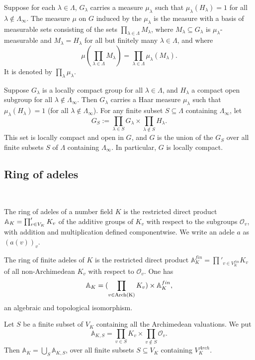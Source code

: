 \documentclass[12pt]{amsart}
\def\A{\mathbb{A}}
\numberwithin{equation}{section}
\begin{document}
Suppose for each $\lambda\in \Lambda$, $G_{\lambda}$ carries a measure $\mu_{\lambda}$ such that $\mu_{\lambda}(H_{\lambda})=1$ for all $\lambda\notin \Lambda_{\infty}$. 
The measure $\mu$ on 
$G$ induced by the $\mu_{\lambda}$ is the measure with a basis of measurable sets consisting of the sets 
$\prod_{\lambda\in \Lambda} M_{\lambda}$, where $M_{\lambda}\subseteq G_{\lambda}$ is $\mu_{\lambda}$-measurable and 
$M_{\lambda}=H_{\lambda}$ for all but finitely many $\lambda\in \Lambda$, and where $$\mu(\prod_{\lambda\in \Lambda} M_{\lambda})=\prod_{\lambda\in \Lambda} 
\mu_{\lambda}(M_{\lambda}).$$
It is denoted by $\prod_{\lambda} \mu_{\lambda}$.

Suppose $G_{\lambda}$ is a locally compact group for all $\lambda \in \Lambda$, and $H_{\lambda}$ a compact open subgroup 
for all $\lambda \notin \Lambda_{\infty}$. Then $G_{\lambda}$ carries a Haar measure $\mu_{\lambda}$ such that 
$\mu_{\lambda}(H_{\lambda})=1$ (for all $\lambda\notin \Lambda_{\infty}$). For any finite subset $S\subseteq \Lambda$ containing $\Lambda_{\infty}$, let 
$$G_S:=\prod_{\lambda\in S} G_{\lambda}\times \prod_{\lambda\notin S} H_{\lambda}.$$ 
This set is locally compact and open in $G$, and 
$G$ is the union of the $G_S$ over all finite subsets $S$ of $\Lambda$ containing $\Lambda_{\infty}$. In particular, $G$ is locally compact.

\medskip

\subsection{\bf Ring of adeles}\label{ssec-adeles} 

\

\medskip

The ring of adeles of a number field $K$ 
is the restricted direct product $\Bbb A_K=\prod'_{v\in V_K} K_v$
of the additive groups of $K_v$ with respect to the subgroups $\mathcal{O}_v$, with 
addition and multiplication defined componentwise. We write an adele $a$ as $(a(v))_{v}$. 

The ring of finite adeles of $K$ is the restricted direct product $\A_{K}^{fin}=\prod'_{v\in V_K^{fin}} K_v$
of all non-Archimedean $K_v$ with respect to $\mathcal{O}_v$. One has 
$$\Bbb A_K=(\prod_{v\in \mathrm{Arch(K)}}K_v) \times \Bbb A_{K}^{fin},$$
an algebraic and topological isomorphism.

Let $S$ be a finite subset of $V_K$ containing all the Archimedean valuations. We put 
$$\A_{K,S}=\prod_{v\in S} K_v \times \prod_{v\notin S} \mathcal{O}_v.$$
Then $\A_K=\bigcup_{S} \A_{K,S}$, over all finite subsets $S\subseteq V_K$ containing $V_K^{Arch}$.
\end{document}
